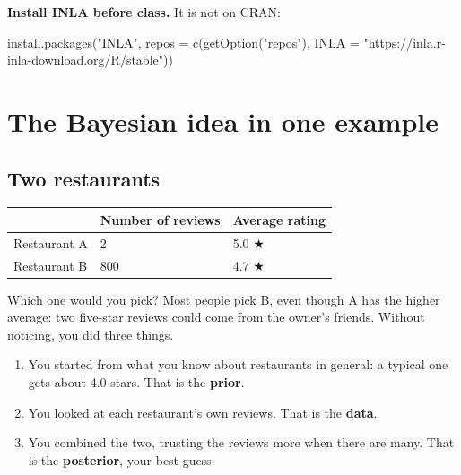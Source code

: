 \documentclass[
  letterpaper,
  DIV=11,
  numbers=noendperiod]{scrartcl}
\newenvironment{Shaded}{\begin{snugshade}}{\end{snugshade}}
\newcommand{\AttributeTok}[1]{\textcolor[rgb]{0.40,0.45,0.13}{#1}}
\newcommand{\FunctionTok}[1]{\textcolor[rgb]{0.28,0.35,0.67}{#1}}
\newcommand{\NormalTok}[1]{\textcolor[rgb]{0.00,0.23,0.31}{#1}}
\newcommand{\StringTok}[1]{\textcolor[rgb]{0.13,0.47,0.30}{#1}}
\providecommand{\tightlist}{%
  \setlength{\itemsep}{0pt}\setlength{\parskip}{0pt}}
\begin{document}
\begin{tcolorbox}[enhanced jigsaw, colbacktitle=quarto-callout-warning-color!10!white, leftrule=.75mm, colframe=quarto-callout-warning-color-frame, bottomrule=.15mm, left=2mm, titlerule=0mm, title=\textcolor{quarto-callout-warning-color}{\faExclamationTriangle}\hspace{0.5em}{Warning}, rightrule=.15mm, bottomtitle=1mm, colback=white, toptitle=1mm, coltitle=black, arc=.35mm, breakable, toprule=.15mm, opacitybacktitle=0.6, opacityback=0]

\textbf{Install INLA before class.} It is not on CRAN:

\begin{Shaded}
\begin{Highlighting}[]
\FunctionTok{install.packages}\NormalTok{(}\StringTok{"INLA"}\NormalTok{,}
  \AttributeTok{repos =} \FunctionTok{c}\NormalTok{(}\FunctionTok{getOption}\NormalTok{(}\StringTok{"repos"}\NormalTok{), }\AttributeTok{INLA =} \StringTok{"https://inla.r{-}inla{-}download.org/R/stable"}\NormalTok{))}
\end{Highlighting}
\end{Shaded}

\end{tcolorbox}

\section{The Bayesian idea in one
example}\label{the-bayesian-idea-in-one-example}

\subsection{Two restaurants}\label{two-restaurants}

\begin{longtable}[]{@{}lll@{}}
\toprule\noalign{}
& Number of reviews & Average rating \\
\midrule\noalign{}
\endhead
\bottomrule\noalign{}
\endlastfoot
Restaurant A & 2 & 5.0 ★ \\
Restaurant B & 800 & 4.7 ★ \\
\end{longtable}

Which one would you pick? Most people pick B, even though A has the
higher average: two five-star reviews could come from the owner's
friends. Without noticing, you did three things.

\begin{enumerate}
\def\labelenumi{\arabic{enumi}.}
\tightlist
\item
  You started from what you know about restaurants in general: a typical
  one gets about 4.0 stars. That is the \textbf{prior}.
\item
  You looked at each restaurant's own reviews. That is the
  \textbf{data}.
\item
  You combined the two, trusting the reviews more when there are many.
  That is the \textbf{posterior}, your best guess.
\end{enumerate}
\end{document}
